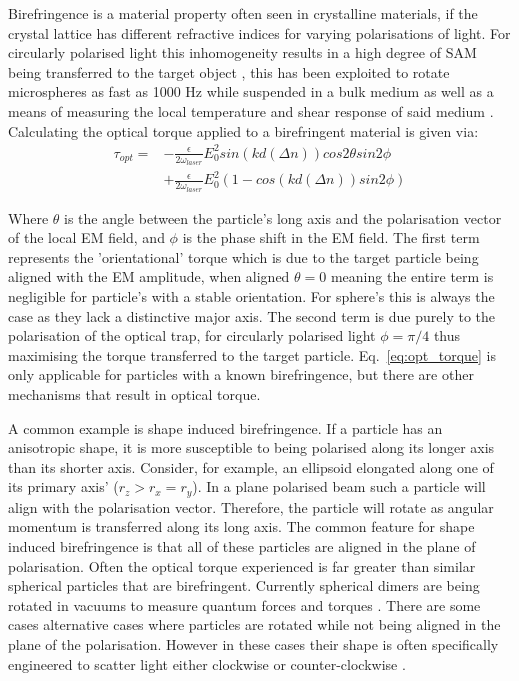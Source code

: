 Birefringence is a material property often seen in crystalline materials, 
if the crystal lattice has different refractive indices for varying 
polarisations of light. For circularly polarised light this inhomogeneity 
results in a high degree of SAM being transferred to the target object \cite{Parkin2009, Arita2016}, this has been exploited to rotate microspheres 
as fast as 1000 Hz while suspended in a bulk medium \cite{Arita2016} as well 
as a means of measuring the local temperature and shear response of said 
medium \cite{Millen2014, RodriguezSevilla2018}. Calculating the optical 
torque applied to a birefringent material is given via:
\begin{equation}
	\label{eq:opt_torque}
	\begin{aligned}
		\tau_{opt} =& -\frac{\epsilon}{2\omega_{laser}}E_0^2sin(kd(\Delta n))cos2\theta sin2\phi 
		\\ &+  \frac{\epsilon}{2\omega_{laser}}E_0^2 (1-cos(kd(\Delta n))sin2\phi)
	\end{aligned}
\end{equation}

Where $\theta$ is the angle between the particle's long axis and the 
polarisation vector of the local EM field, and $\phi$ is the phase shift 
in the EM field. The first term represents the 'orientational' torque which 
is due to the target particle being aligned with the EM amplitude, when 
aligned $\theta=0$ meaning the entire term is negligible for particle's with a stable orientation. For sphere's this is always the case as they lack a 
distinctive major axis. The second term is due purely to the polarisation 
of the optical trap, for circularly polarised light $\phi=\pi/4$ thus 
maximising the torque transferred to the target particle. Eq.~\eqref{eq:opt_torque} is only applicable for particles with a known
birefringence, but there are other mechanisms that result in optical torque.

A common example is shape induced birefringence. If a particle has an 
anisotropic shape, it is more susceptible to being polarised along its 
longer axis than its shorter axis. Consider, for example, an ellipsoid 
elongated along one of its primary axis' ($r_z > r_x = r_y$). In a 
plane polarised beam such a particle will align with the polarisation
vector. Therefore, the particle will rotate as angular momentum is 
transferred along its long axis. The common feature for shape induced
birefringence is that all of these particles are aligned in the plane
of polarisation. Often the optical torque experienced is far greater 
than similar spherical particles that are birefringent. Currently 
spherical dimers are being rotated in vacuums to measure quantum forces
and torques \cite{Ahn2018, Reimann2018}. There are some cases alternative 
cases where particles are rotated while not being aligned in the plane 
of the polarisation. However in these cases their shape is often 
specifically engineered to scatter light either clockwise or 
counter-clockwise \cite{Higurashi1994}. 

